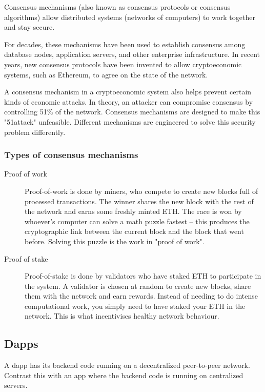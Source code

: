 Consensus mechanisms (also known as consensus protocols or consensus algorithms) allow distributed systems (networks of computers) to work together and stay secure.

For decades, these mechanisms have been used to establish consensus among database nodes, application servers, and other enterprise infrastructure. In recent years, new consensus protocols have been invented to allow \gls{cryptoeconomic} systems, such as Ethereum, to agree on the state of the network.

A consensus mechanism in a cryptoeconomic system also helps prevent certain kinds of economic attacks. In theory, an attacker can compromise consensus by controlling 51\% of the network. Consensus mechanisms are designed to make this "\gls{51attack}" unfeasible. Different mechanisms are engineered to solve this security problem differently.
\subsubsection{Types of consensus mechanisms}

\begin{description}
\item[Proof of work] Proof-of-work is done by miners, who compete to create new blocks full of processed transactions. The winner shares the new block with the rest of the network and earns some freshly minted \gls{ETH}. The race is won by whoever's computer can solve a math puzzle fastest – this produces the cryptographic link between the current block and the block that went before. Solving this puzzle is the work in "proof of work".
\item[Proof of stake] Proof-of-stake is done by validators who have staked ETH to participate in the system. A validator is chosen at random to create new blocks, share them with the network and earn rewards. Instead of needing to do intense computational work, you simply need to have staked your ETH in the network. This is what incentivises healthy network behaviour.
\end{description}

\subsection{Dapps}

A dapp has its backend code running on a decentralized peer-to-peer network. Contrast this with an app where the backend code is running on centralized servers.

